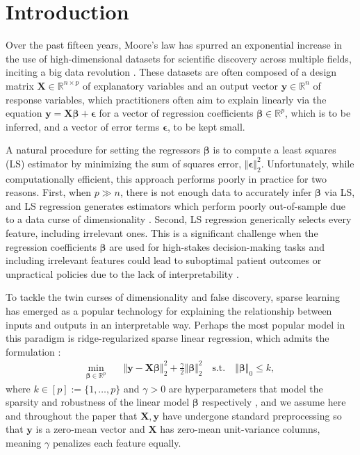 \documentclass[opre,nonblindrev]{informs3} %
\begin{document}
\section{Introduction}\label{sec:intro}
Over the past fifteen years, Moore's law has spurred an exponential increase in the use of high-dimensional datasets for scientific discovery across multiple fields, inciting a big data revolution \citep[][]{mcafee2012big, groves2016big}. These datasets are often composed of a design matrix $\bm{X} \in \mathbb{R}^{n \times p}$ of explanatory variables and an output vector $\bm{y} \in \mathbb{R}^n$ of response variables, which practitioners often aim to explain linearly via the equation $\bm{y}=\bm{X}\bm{\beta}+\bm{\epsilon}$ for a vector of regression coefficients $\bm{\beta} \in \mathbb{R}^p$, which is to be inferred, and a vector of error terms $\bm{\epsilon}$, to be kept small. 

A natural procedure for setting the regressors $\bm{\beta}$ is to compute a least squares (LS) estimator by minimizing the sum of squares error, $\Vert \bm{\epsilon}\Vert_2^2$. Unfortunately, while computationally efficient, this approach performs poorly in practice for two reasons. First, when $p \gg n$, there is not enough data to accurately infer $\bm{\beta}$ via LS, and LS regression generates estimators which perform poorly out-of-sample due to a data curse of dimensionality \citep[c.f.][]{buhlmann2011statistics, gamarnik2022sparse}.
Second, LS regression generically selects every feature, including irrelevant ones. This is a significant challenge when the regression coefficients $\bm{\beta}$ are used for high-stakes decision-making tasks and including irrelevant features could lead to suboptimal patient outcomes or unpractical policies due to the lack of interpretability \citep{rudin2019stop, doshi2017towards}.

To tackle the twin curses of dimensionality and false discovery, sparse learning has emerged as a popular technology for explaining the relationship between inputs and outputs in an interpretable way. Perhaps the most popular model in this paradigm is ridge-regularized sparse linear regression, which admits the formulation \citep[][]{bertsimas2020sparse,xie2020scalable}:
\begin{align}\label{eqn:l0l2_training}
    \min_{\bm{\beta} \in \mathbb{R}^p} \quad & \Vert \bm{y}-\bm{X}\bm{\beta}\Vert_2^2 + \frac{\gamma}{2} \Vert \bm{\beta}\Vert_2^2 \quad \text{s.t.} \quad \Vert \bm{\beta}\Vert_0 \leq k,
\end{align} %
where $k \in [p]:=\{1, \ldots, p\}$ and $\gamma >0$ are hyperparameters that model the sparsity and robustness of the linear model $\bm{\beta}$ respectively \citep[c.f.][]{bertsimas2018characterization}, and we assume here and throughout the paper that $\bm{X}, \bm{y}$ have undergone standard preprocessing so that $\bm{y}$ is a zero-mean vector and $\bm{X}$ has zero-mean unit-variance columns, meaning $\gamma$ penalizes each feature equally.
\end{document}
